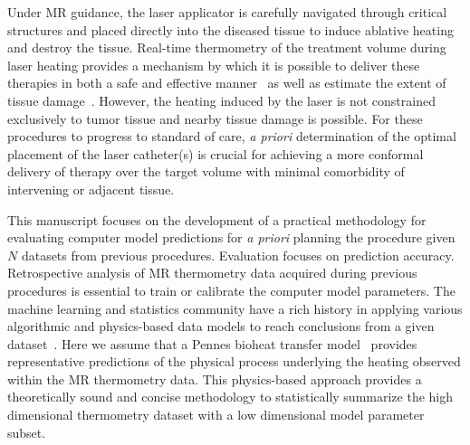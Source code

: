 \documentclass[12pt]{article}
\begin{document}
Under MR guidance, the laser applicator is carefully navigated through
critical structures and placed directly into the diseased tissue to induce
ablative heating and destroy the tissue. 
Real-time thermometry of the treatment volume during
laser heating provides a mechanism by which it is possible to deliver
these therapies in both a safe and effective 
manner~\cite{rieke2008mr, denis2005magnetic,stafford2010magnetic,
woodrum2010feasibility} as well as estimate the extent of tissue
damage~\cite{hyperthermia2003basic,mcdannold2006uterine,mcnichols2004technical}. 
However, the heating induced by the laser is not constrained exclusively
to tumor tissue and nearby tissue damage is possible. 
For these procedures to progress to standard of care, 
\textit{a priori} determination of the optimal placement of the laser catheter(s) is crucial
for achieving a more conformal delivery of therapy over the target volume
with minimal comorbidity of intervening or adjacent tissue. 

This manuscript focuses on the development of a practical methodology for
evaluating computer model predictions for \textit{a priori} planning the procedure  
given $N$ datasets from previous procedures.
{\color{red} Evaluation focuses on prediction accuracy.}
Retrospective analysis of MR thermometry data acquired during previous procedures is
essential to train or calibrate the computer model parameters. 
The machine learning and statistics community have a rich history in
applying various algorithmic and physics-based data models to reach conclusions from a
given dataset~\cite{Breiman2001,Hastie2005}. 
Here we assume that a Pennes bioheat transfer model~\cite{Pennes1948} provides
representative predictions of the  physical process underlying the heating
observed within the MR thermometry data.
This physics-based approach
provides a theoretically sound and concise methodology to statistically summarize the high
dimensional thermometry dataset with a low dimensional model parameter subset. 
\end{document}
